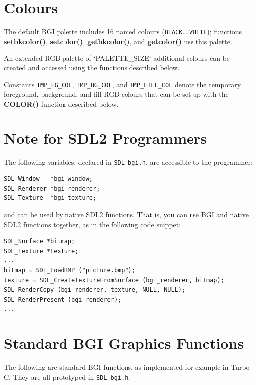 \documentclass[a4paper,11pt]{article}
\newcommand{\func}[1]{\textbf{#1}}  %
\newcommand{\F}[1]{\texttt{#1}}     %
\newcommand{\T}[1]{\texttt{#1}}     %
\begin{document}
\section{Colours}

The default BGI palette includes 16 named colours (\T{BLACK}{\ldots}
\T{WHITE}); functions \func{setbkcolor()}, \func{setcolor()},
\func{getbkcolor()}, and \func{getcolor()} use this palette.

An extended RGB palette of `PALETTE\_SIZE` additional colours can be
created and accessed using the functions described below.

Constants \T{TMP\_FG\_COL}, \T{TMP\_BG\_COL}, and \T{TMP\_FILL\_COL}
denote the temporary foreground, background, and fill RGB colours that
can be set up with the \func{COLOR()} function described below.


\section{Note for SDL2 Programmers}

The following variables, declared in \F{SDL\_bgi.h}, are accessible to
the programmer:

\begin{small}
\begin{verbatim}
SDL_Window   *bgi_window;
SDL_Renderer *bgi_renderer;
SDL_Texture  *bgi_texture;
\end{verbatim}
\end{small}

and can be used by native SDL2 functions. That is, you can use BGI and
native SDL2 functions together, as in the following code snippet:

\begin{small}
\begin{verbatim}
SDL_Surface *bitmap;
SDL_Texture *texture;
...
bitmap = SDL_LoadBMP ("picture.bmp");
texture = SDL_CreateTextureFromSurface (bgi_renderer, bitmap);
SDL_RenderCopy (bgi_renderer, texture, NULL, NULL);
SDL_RenderPresent (bgi_renderer);
...
\end{verbatim}
\end{small}


\section{Standard BGI Graphics Functions}

The following are standard BGI functions, as implemented for example
in Turbo C. They are all prototyped in \F{SDL\_bgi.h}.
\end{document}
